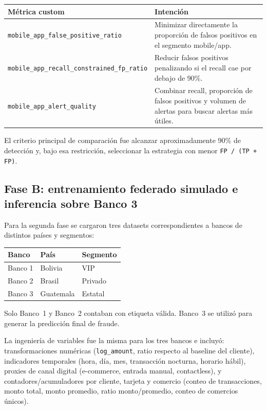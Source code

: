 \documentclass[10pt,a4paper]{article}
\begin{document}
\begin{center}
\small
\begin{tabular}{p{} p{}}
\toprule
\textbf{Métrica custom} & \textbf{Intención} \\
\midrule
\texttt{mobile\_app\_false\_positive\_ratio}
  & Minimizar directamente la proporción de falsos positivos en el segmento mobile/app. \\[4pt]
\texttt{mobile\_app\_recall\_}\newline\texttt{constrained\_fp\_ratio}
  & Reducir falsos positivos penalizando si el recall cae por debajo de 90\%. \\[4pt]
\texttt{mobile\_app\_alert\_quality}
  & Combinar recall, proporción de falsos positivos y volumen de alertas para
    buscar alertas más útiles. \\
\bottomrule
\end{tabular}
\end{center}

El criterio principal de comparación fue alcanzar aproximadamente 90\% de detección y,
bajo esa restricción, seleccionar la estrategia con menor \texttt{FP\,/\,(TP\,+\,FP)}.

\subsection{Fase B: entrenamiento federado simulado e inferencia sobre Banco 3}

Para la segunda fase se cargaron tres datasets correspondientes a bancos de distintos países
y segmentos:

\begin{center}
\begin{tabular}{lll}
\toprule
\textbf{Banco} & \textbf{País} & \textbf{Segmento} \\
\midrule
Banco 1 & Bolivia  & VIP \\
Banco 2 & Brasil   & Privado \\
Banco 3 & Guatemala & Estatal \\
\bottomrule
\end{tabular}
\end{center}

Solo Banco~1 y Banco~2 contaban con etiqueta válida. Banco~3 se utilizó para generar
la predicción final de fraude.

La ingeniería de variables fue la misma para los tres bancos e incluyó: transformaciones numéricas
(\texttt{log\_amount}, ratio respecto al baseline del cliente), indicadores temporales (hora,
día, mes, transacción nocturna, horario hábil), proxies de canal digital (e-commerce, entrada
manual, contactless), y contadores/acumuladores por cliente, tarjeta y comercio (conteo de
transacciones, monto total, monto promedio, ratio monto/promedio, conteo de comercios únicos).
\end{document}
